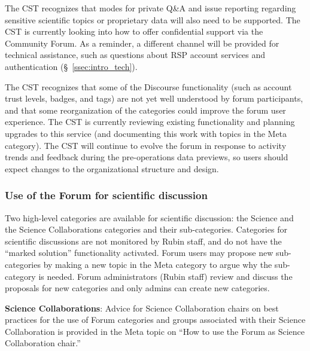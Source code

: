 \documentclass[DM,authoryear,toc]{lsstdoc}
\begin{document}

The CST recognizes that modes for private Q\&A and issue reporting regarding sensitive scientific topics or proprietary data will also need to be supported.
The CST is currently looking into how to offer confidential support via the Community Forum.
As a reminder, a different channel will be provided for technical assistance, such as questions about RSP account services and authentication (\S~\ref{ssec:intro_tech}).

The CST recognizes that some of the Discourse functionality (such as account trust levels, badges, and tags) are not yet well understood by forum participants, and that some reorganization of the categories could improve the forum user experience.
The CST is currently reviewing existing functionality and planning upgrades to this service (and documenting this work with topics in the Meta category).
The CST will continue to evolve the forum in response to activity trends and feedback during the pre-operations data previews, so users should expect changes to the organizational structure and design. 

\subsubsection{Use of the Forum for scientific discussion}\label{sssec:forum_discussion}

Two high-level categories are available for scientific discussion: the Science and the Science Collaborations categories and their sub-categories. 
Categories for scientific discussions are not monitored by Rubin staff, and do not have the ``marked solution'' functionality activated.
Forum users may propose new sub-categories by making a new topic in the Meta category to argue why the sub-category is needed.
Forum administrators (Rubin staff) review and discuss the proposals for new categories and only admins can create new categories.

{\bf Science Collaborations}:
Advice for Science Collaboration chairs on best practices for the use of Forum categories and groups associated with their Science Collaboration is provided in the Meta topic on ``How to use the Forum as Science Collaboration chair.'' 
\end{document}

